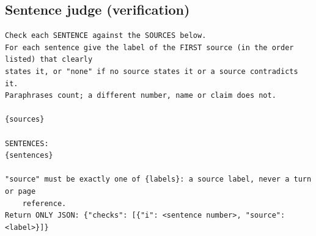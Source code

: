 \subsection{Sentence judge (verification)}
\begin{footnotesize}
\begin{verbatim}
Check each SENTENCE against the SOURCES below.
For each sentence give the label of the FIRST source (in the order listed) that clearly
states it, or "none" if no source states it or a source contradicts it.
Paraphrases count; a different number, name or claim does not.

{sources}

SENTENCES:
{sentences}

"source" must be exactly one of {labels}: a source label, never a turn or page
    reference.
Return ONLY JSON: {"checks": [{"i": <sentence number>, "source": <label>}]}
\end{verbatim}
\end{footnotesize}

